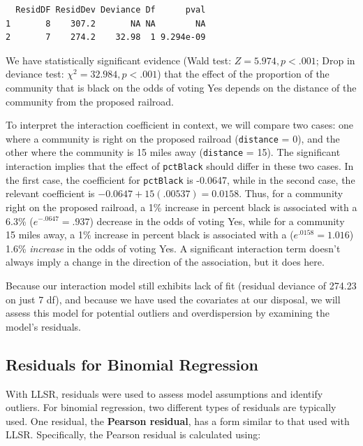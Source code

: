 \documentclass[
]{krantz}
\begin{document}
\begin{verbatim}
  ResidDF ResidDev Deviance Df      pval
1       8    307.2       NA NA        NA
2       7    274.2    32.98  1 9.294e-09
\end{verbatim}

We have statistically significant evidence (Wald test: \(Z = 5.974, p<.001\); Drop in deviance test: \(\chi^2=32.984, p<.001\)) that the effect of the proportion of the community that is black on the odds of voting Yes depends on the distance of the community from the proposed railroad.

To interpret the interaction coefficient in context, we will compare two cases: one where a community is right on the proposed railroad (\texttt{distance} = 0), and the other where the community is 15 miles away (\texttt{distance} = 15). The significant interaction implies that the effect of \texttt{pctBlack} should differ in these two cases. In the first case, the coefficient for \texttt{pctBlack} is -0.0647, while in the second case, the relevant coefficient is \(-0.0647+15(.00537) = 0.0158\). Thus, for a community right on the proposed railroad, a 1\% increase in percent black is associated with a 6.3\% (\(e^{-.0647}=.937\)) decrease in the odds of voting Yes, while for a community 15 miles away, a 1\% increase in percent black is associated with a (\(e^{.0158}=1.016\)) 1.6\% \emph{increase} in the odds of voting Yes. A significant interaction term doesn't always imply a change in the direction of the association, but it does here.

Because our interaction model still exhibits lack of fit (residual deviance of 274.23 on just 7 df), and because we have used the covariates at our disposal, we will assess this model for potential outliers and overdispersion by examining the model's residuals.

\hypertarget{residuals-for-binomial-regression}{%
\subsection{Residuals for Binomial Regression}\label{residuals-for-binomial-regression}}

With LLSR, residuals were used to assess model assumptions and identify outliers. For binomial regression, two different types of residuals are typically used. One residual, the \textbf{Pearson residual},  has a form similar to that used with LLSR. Specifically, the Pearson residual is calculated using:
\end{document}
